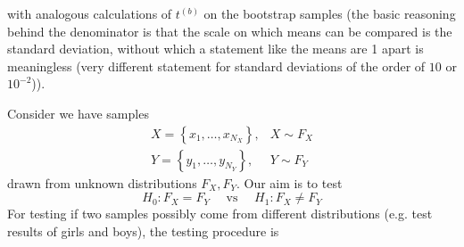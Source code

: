 with analogous calculations of $t^{(b)}$ on the bootstrap samples (the basic reasoning behind the denominator is that the scale on which means can be compared
is the standard deviation, without which a statement like the means are 1 apart is meaningless (very different statement for standard deviations
of the order of $10$ or $10^{-2}$)).

Consider we have samples
\begin{equation}
    \begin{array}{ll}
    X=\left\{x_1, \ldots, x_{N_X}\right\}, & X \sim F_X \\
    Y=\left\{y_1, \ldots, y_{N_Y}\right\}, & Y \sim F_Y
    \end{array}
\end{equation}
drawn from unknown distributions $F_X,F_Y$. Our aim is to test
\begin{equation}
    H_0: F_X = F_Y \quad \text { vs } \quad H_1: F_X \neq F_Y
\end{equation}
For testing if two samples possibly come from different distributions
(e.g. test results of girls and boys), the testing procedure is
